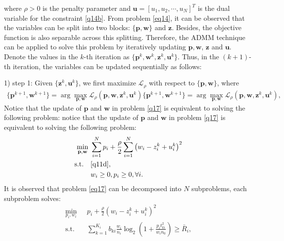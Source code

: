 \documentclass[journal]{IEEEtran}
\begin{document}
\begin{IEEEkeywords}
where $\rho > 0$ is the penalty parameter and $\mathbf{u} = [u_1, u_2, \cdots, u_N]^T$ is the dual variable for the  constraint \eqref{q14b}. From problem \eqref{eq14}, it can be observed that the variables can be split into two blocks: $\{\mathbf{p}, \mathbf{w}\}$ and $\mathbf{z}$. Besides, the objective function is also separable across this splitting. Therefore, the ADMM technique can be applied to solve this problem by iteratively updating $\mathbf{p}, \mathbf{w}$, $\mathbf{z}$ and $\mathbf{u}$. Denote the values in the $k$-th iteration as $\{\mathbf{p}^k, \mathbf{w}^k, \mathbf{z}^k, \mathbf{u}^k\}$. Thus, in the $(k+1)$-th iteration, the variables can be updated sequentially as follows:
 
1) step 1: Given $\{\mathbf{z}^k, \mathbf{u}^k\}$, we first maximize $\mathcal{L}_\rho$ with respect to $\{\mathbf{p}, \mathbf{w}\}$, where
\begin{align}
\{\mathbf{p}^{k+1}, \mathbf{w}^{k+1}\} = \arg \max_{\mathbf{p}, \mathbf{w}} \mathcal{L}_\rho\left(\mathbf{p}, \mathbf{w}, \mathbf{z}^k, \mathbf{u}^k\right) \label{q17}
\{\mathbf{p}^{k+1}, \mathbf{w}^{k+1}\} = \arg \max_{\mathbf{p}, \mathbf{w}} \mathcal{L}_\rho\left(\mathbf{p}, \mathbf{w}, \mathbf{z}^k, \mathbf{u}^k\right), \label{q17}
\end{align}
Notice that the update of $\mathbf{p}$ and $\mathbf{w}$ in problem \eqref{q17} is equivalent to solving the following problem:
notice that the update of $\mathbf{p}$ and $\mathbf{w}$ in problem \eqref{q17} is equivalent to solving the following problem:
\begin{subequations}\label{eq17}
	\begin{align}
	\min_{\mathbf{p}, \mathbf{w}}\ & \sum\limits_{i = 1}^{N} p_i + \frac{\rho}{2}\sum\limits_{i = 1}^{N}\left(w_i - z_i^k + u_i^k \right)^2  \label{q17a} \\ \mbox{s.t.} \quad &  \eqref{q11d},  \label{q17b} \\
	& w_i\geq 0, p_i \geq 0, \forall i. \label{q17c}
	\end{align}
\end{subequations}
It is observed that problem \eqref{eq17} can be decomposed into $N$ subproblems, each subproblem solves:
\begin{subequations}\label{eq18}
	\begin{align}
	\min_{p_i, w_i}\ & p_i + \frac{\rho}{2}\left(w_i - z_i^k + u_i^k \right)^2  \label{q18a} \\ \mbox{s.t.} \quad & \sum\limits_{k = 1}^{K_i}b_{ki}\frac{w_i}{n_i}\log_2\left(1 + \frac{p_it_{ki}^2}{w_in_0}\right) \geq \bar{R}_i,  \label{q18b} \\

\end{align}
\end{subequations}
\end{IEEEkeywords}
\end{document}
